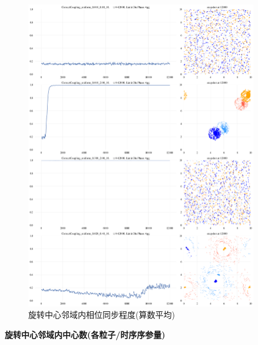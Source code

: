 \documentclass{article}
\begin{document}
\begin{figure}[H]
	\centering
	\includegraphics[width=0.9\textwidth]{./figs/limitDisPhaseSyncOp_ts.png}
	\caption{旋转中心邻域内相位同步程度(算数平均)}
	\label{fig:fig234t.3}
\end{figure}



\newpage
\noindent\textbf{旋转中心邻域内中心数(各粒子/时序序参量)}
\end{document}
